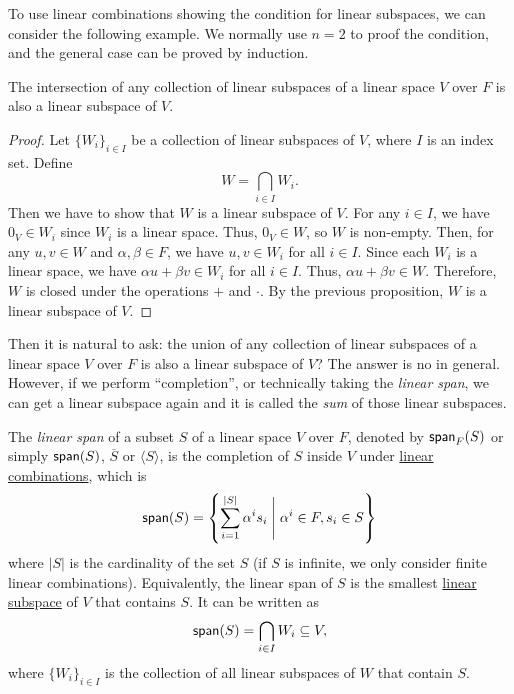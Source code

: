 To use linear combinations showing the condition for linear subspaces, we can consider the following example. We normally use $n = 2$ to proof the condition, and the general case can be proved by induction.

\begin{proposition}
  The intersection of any collection of linear subspaces of a linear space $V$ over $F$ is also a linear subspace of $V$.
\end{proposition}
\begin{proof}
  Let ${\{ W_i \}}_{i \in I}$ be a collection of linear subspaces of $V$, where $I$ is an index set. Define
  \[ W = \bigcap_{i \in I} W_i. \]
  Then we have to show that $W$ is a linear subspace of $V$. For any $i \in I$, we have $0_V \in W_i$ since $W_i$ is a linear space. Thus, $0_V \in W$, so $W$ is non-empty. Then, for any $u, v \in W$ and $\alpha, \beta \in F$, we have $u, v \in W_i$ for all $i \in I$. Since each $W_i$ is a linear space, we have $\alpha u + \beta v \in W_i$ for all $i \in I$. Thus, $\alpha u + \beta v \in W$. Therefore, $W$ is closed under the operations $+$ and $\cdot$. By the previous proposition, $W$ is a linear subspace of $V$.
\end{proof}

Then it is natural to ask: the union of any collection of linear subspaces of a linear space $V$ over $F$ is also a linear subspace of $V$? The answer is no in general. However, if we perform ``completion'', or technically taking the \emph{linear span}, we can get a linear subspace again and it is called the \emph{sum} of those linear subspaces.

\begin{definition}\label{def:span}
  The \emph{linear span} of a subset $S$ of a linear space $V$ over $F$, denoted by $\operatorname{\text{\normalfont\sffamily span}}_F(S)$ or simply $\operatorname{\text{\normalfont\sffamily span}}(S)$, $\overline{S}$ or $\langle S \rangle$, is the completion of $S$ inside $V$ under \hyperref[def:linear_combination]{linear combinations}, which is
  \[ \operatorname{\text{\normalfont\sffamily span}}(S) = \left\{ \sum_{i = 1}^{|S|} \alpha^i s_i \Biggm| \alpha^i \in F, s_i \in S \right\} \]
  where $|S|$ is the cardinality of the set $S$ (if $S$ is infinite, we only consider finite linear combinations). Equivalently, the linear span of $S$ is the smallest \hyperref[def:linear_subspace]{linear subspace} of $V$ that contains $S$. It can be written as
  \[
    \operatorname{\text{\normalfont\sffamily span}}(S) = \bigcap_{i \in I} W_i \subseteq V,
  \]
  where ${\{ W_i \}}_{i \in I}$ is the collection of all linear subspaces of $W$ that contain $S$.
\end{definition}

